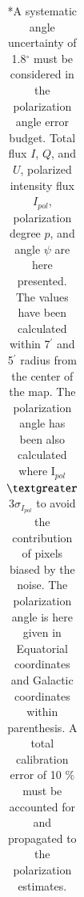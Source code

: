 \documentclass[twocolumn,traditabstract]{aa}
\begin{document}
\begin{table}
\begin{tabular}{ccccccccc}
    \hline            
    \hline   
    \end{tabular}
   \caption{ 
   	*A systematic angle uncertainty of 1.8$^{\circ}$ must be considered in the polarization angle error budget.
   	 Total flux $I$, $Q$, and $U$, polarized intensity flux $I_{pol}$, polarization degree $p$, and angle $\psi$ are here presented. The values have been calculated within 7$^{\prime}$ and 5$^{\prime}$ radius from the center of the map. The polarization angle has been also calculated where I$_{pol}$ $\textgreater$ 3$\sigma_{I_{pol}}$ to avoid the contribution of pixels biased by the noise.
     The polarization angle is here given in Equatorial coordinates and Galactic coordinates within parenthesis. 
     A total calibration error of 10 $\%$ must be accounted for and propagated to the
     polarization estimates.
    }
    \label{tab:crab_results}
 \end{table}
 
\end{document}
